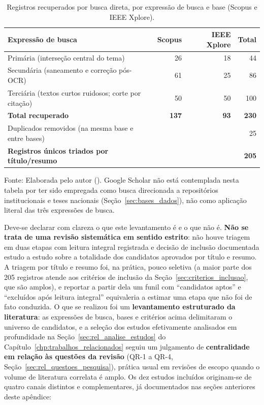 \begin{apendicesenv}
\begin{table}[htb]
\caption{Registros recuperados por busca direta, por expressão de busca e base (Scopus e IEEE Xplore).}
\label{tab-fluxo-selecao}
\centering
\small
\begin{tabular}{lrrr}
\hline
\textbf{Expressão de busca} & \textbf{Scopus} & \textbf{IEEE Xplore} & \textbf{Total} \\
\hline
Primária (interseção central do tema)            & 26  & 18 & 44  \\
Secundária (saneamento e correção pós-OCR)       & 61  & 25 & 86  \\
Terciária (textos curtos ruidosos; corte por citação) & 50 & 50 & 100 \\
\hline
\textbf{Total recuperado}                         & \textbf{137} & \textbf{93} & \textbf{230} \\
Duplicados removidos (na mesma base e entre bases) &  &  & 25 \\
\textbf{Registros únicos triados por título/resumo} &  &  & \textbf{205} \\
\hline
\end{tabular}
\begin{flushleft}
\footnotesize Fonte: Elaborada pelo autor (\the\year). Google Scholar não está contemplada nesta tabela por ter sido empregada como busca direcionada a repositórios institucionais e teses nacionais (Seção~\ref{sec:bases_dados}), não como aplicação literal das três expressões de busca.
\end{flushleft}
\end{table}

Deve-se declarar com clareza o que este levantamento é e o que não é. \textbf{Não se trata de uma revisão sistemática em sentido estrito}: não houve triagem em duas etapas com leitura integral registrada e decisão de inclusão documentada estudo a estudo sobre a totalidade dos candidatos aprovados por título e resumo. A triagem por título e resumo foi, na prática, pouco seletiva (a maior parte dos 205 registros atende aos critérios de inclusão da Seção~\ref{sec:criterios_inclusao}, que são amplos), e reportar a partir dela um funil com ``candidatos aptos'' e ``excluídos após leitura integral'' equivaleria a estimar uma etapa que não foi de fato conduzida. O que se realizou foi um \textbf{levantamento estruturado da literatura}: as expressões de busca, bases e critérios acima delimitaram o universo de candidatos, e a seleção dos estudos efetivamente analisados em profundidade na Seção~\ref{sec:rel_analise_estudos} do Capítulo~\ref{chp:trabalhos_relacionados} seguiu um julgamento de \textbf{centralidade em relação às questões da revisão} (QR-1 a QR-4, Seção~\ref{sec:rel_questoes_pesquisa}), prática usual em revisões de escopo quando o volume de literatura correlata é amplo. Os dez estudos incluídos originam-se de quatro canais distintos e complementares, já documentados nas seções anteriores deste apêndice:


\end{apendicesenv}
